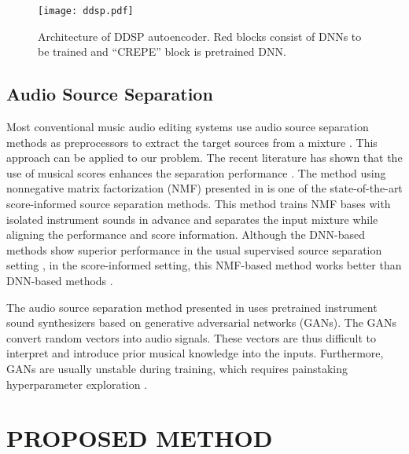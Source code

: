 \documentclass{article}
\begin{document}
\begin{figure}[t]
\centering 
\texttt{[image: ddsp.pdf]}
\caption{Architecture of DDSP autoencoder. Red blocks consist of DNNs to be trained and “CREPE” block is pretrained DNN.}
\vspace{-9pt}
\label{fig:ddsp}
\end{figure}

\subsection{Audio Source Separation}
Most conventional music audio editing systems use audio source separation methods as preprocessors to extract the target sources from a mixture \cite{timbre_replacement, equalizer, changing_timbre, time_domain}. This approach can be applied to our problem.
The recent literature has shown that the use of musical scores enhances the separation performance \cite{gakuhukouka1,gakuhukouka2,gakuhukouka3,simsd}.
The method using nonnegative matrix factorization (NMF) presented in \cite{simsd} is one of the state-of-the-art score-informed source separation methods. This method trains NMF bases with isolated instrument sounds in advance and separates the input mixture while aligning the performance and score information.
Although the DNN-based methods show superior performance in the usual supervised source separation setting \cite{bunrireport}, in the score-informed setting, this NMF-based method works better than DNN-based methods \cite{simsd}.

The audio source separation method presented in \cite{gp} uses pretrained instrument sound synthesizers based on generative adversarial networks (GANs).
The GANs convert random vectors into audio signals.
These vectors are thus difficult to interpret and introduce prior musical knowledge into the inputs.
Furthermore, GANs are usually unstable during training, which requires painstaking hyperparameter exploration \cite{gan_overview}.
\section{PROPOSED METHOD}
\end{document}
